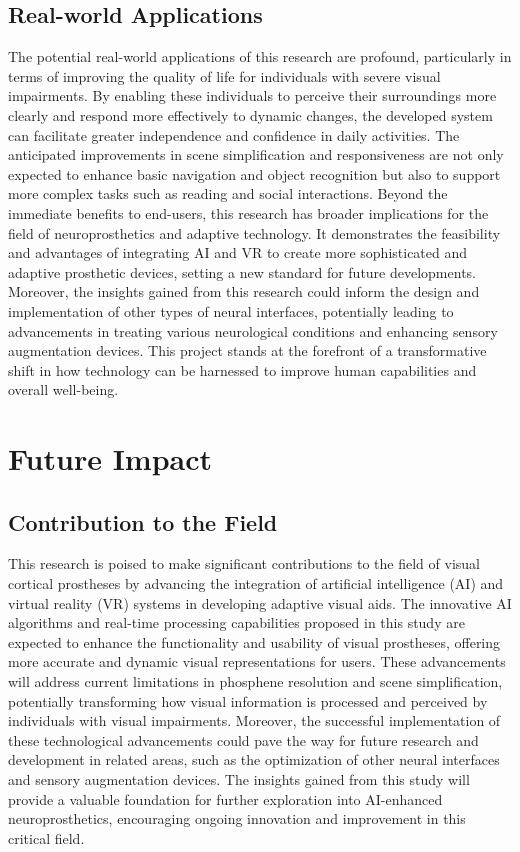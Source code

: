 \documentclass[10pt]{article}
\begin{document}
\subsection*{Real-world Applications}
The potential real-world applications of this research are profound,
particularly in terms of improving the quality of life for individuals with
severe visual impairments. By enabling these individuals to perceive their
surroundings more clearly and respond more effectively to dynamic changes, the
developed system can facilitate greater independence and confidence in daily
activities. The anticipated improvements in scene simplification and
responsiveness are not only expected to enhance basic navigation and object
recognition but also to support more complex tasks such as reading and social
interactions. Beyond the immediate benefits to end-users, this research has
broader implications for the field of neuroprosthetics and adaptive technology.
It demonstrates the feasibility and advantages of integrating AI and VR to
create more sophisticated and adaptive prosthetic devices, setting a new
standard for future developments. Moreover, the insights gained from this
research could inform the design and implementation of other types of neural
interfaces, potentially leading to advancements in treating various neurological
conditions and enhancing sensory augmentation devices. This project stands at
the forefront of a transformative shift in how technology can be harnessed to
improve human capabilities and overall well-being.

\section*{Future Impact}\label{sec:impact}
\subsection*{Contribution to the Field}
This research is poised to make significant contributions to the field of visual
cortical prostheses by advancing the integration of artificial intelligence (AI)
and virtual reality (VR) systems in developing adaptive visual aids. The
innovative AI algorithms and real-time processing capabilities proposed in this
study are expected to enhance the functionality and usability of visual
prostheses, offering more accurate and dynamic visual representations for users.
These advancements will address current limitations in phosphene resolution and
scene simplification, potentially transforming how visual information is
processed and perceived by individuals with visual impairments. Moreover, the
successful implementation of these technological advancements could pave the way
for future research and development in related areas, such as the optimization
of other neural interfaces and sensory augmentation devices. The insights gained
from this study will provide a valuable foundation for further exploration into
AI-enhanced neuroprosthetics, encouraging ongoing innovation and improvement in
this critical field.
\end{document}
